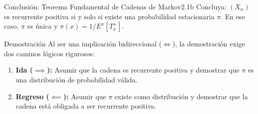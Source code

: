 \documentclass[10pt,a4paper]{article}
\begin{document}
\begin{ejercicio}{Conclusión: Teorema Fundamental de Cadenas de Markov}{2.1b}
    Concluya: $(X_n)$ es recurrente positiva si y solo si existe una probabilidad estacionaria $\pi$. En ese caso, $\pi$ es única y $\pi(x) = 1/E^x[T_x^+]$.
\end{ejercicio}

\vspace{2mm}

\begin{nota}{Demostración}
    Al ser una implicación bidireccional ($\iff$), la demostración exige dos caminos lógicos rigurosos:
    \begin{enumerate}
        \item \textbf{Ida ($\implies$):} Asumir que la cadena es recurrente positiva y demostrar que $\pi$ es una distribución de probabilidad válida.
        \item \textbf{Regreso ($\impliedby$):} Asumir que $\pi$ existe como distribución y demostrar que la cadena está obligada a ser recurrente positiva.
    \end{enumerate}
\end{nota}

\vspace{2mm}
\end{document}
